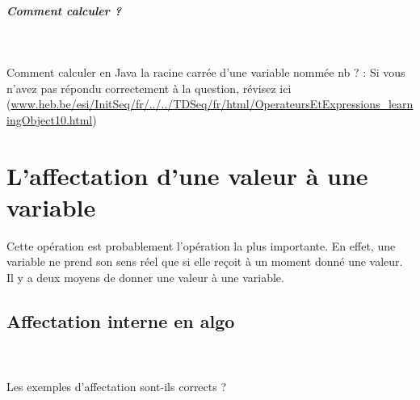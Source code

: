 \documentclass[11pt,a4paper]{article}
\begin{document}
			
		\subparagraph{Comment calculer ?} 
		
                \textcolor{white}{.} \par
            Comment calculer en Java
                la racine carr\'ee d'une variable nomm\'ee nb ? :  \textcolor{gray}{\underline{\hspace*{10em}}} Si vous n'avez pas r\'epondu correctement \`a la question, 
          r\'evisez ici (\url{www.heb.be/esi/InitSeq/fr/../../TDSeq/fr/html/OperateursEtExpressions\_learningObject10.html})
            \par
        \section{L'affectation d'une valeur \`a une variable}
				Cette op\'eration est probablement l'op\'eration la plus importante. En effet, une variable ne
        prend son sens r\'eel que si elle re\c coit \`a un moment donn\'e une valeur. Il y a deux moyens de
        donner une valeur \`a une variable.
      
            \par
        \subsection{Affectation interne en algo}
			
		\subparagraph{} 
		
                \textcolor{white}{.} \par
            Les exemples d'affectation sont-ils corrects ?
						
\end{document}

